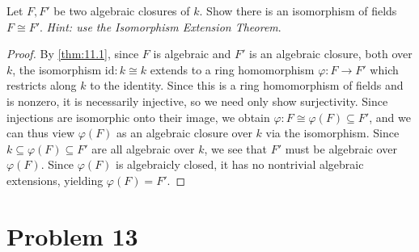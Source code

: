 \documentclass[11pt, letterpaper]{article}
\begin{document}
\begin{problem}\label{12.4}
	Let $F,F'$ be two algebraic closures of $k$. Show there is an isomorphism of fields $F\cong F'$. \emph{Hint: use the Isomorphism Extension Theorem}.
\end{problem}
\begin{proof}
	By \cref{thm:11.1}, since $F$ is algebraic and $F'$ is an algebraic closure, both over $k$, the isomorphism $\mathrm{id} : k \cong k$ extends to a ring homomorphism $\varphi : F \to F'$ which restricts along $k$ to the identity. Since this is a ring homomorphism of fields and is nonzero, it is necessarily injective, so we need only show surjectivity. Since injections are isomorphic onto their image, we obtain $\varphi : F \cong \varphi (F)\subseteq F'$, and we can thus view $\varphi (F)$ as an algebraic closure over $k$ via the isomorphism. Since $k\subseteq \varphi (F)\subseteq F'$ are all algebraic over $k$, we see that $F'$ must be algebraic over $\varphi (F)$. Since $\varphi (F)$ is algebraicly closed, it has no nontrivial algebraic extensions, yielding $\varphi (F)=F'$.
\end{proof}

\section{Problem 13}
\end{document}
